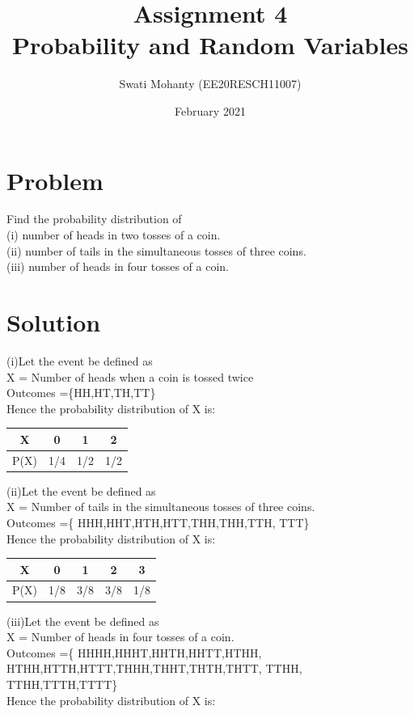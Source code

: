 \documentclass[journal,12pt,twocolumn]{IEEEtran}
\title{Assignment 4
\\Probability and Random Variables }
\author{Swati Mohanty (EE20RESCH11007) }
\date{February 2021}
\begin{document}
\maketitle


\section{Problem}
Find the probability distribution of
\\(i) number of heads in two tosses of a coin.
\\(ii) number of tails in the simultaneous tosses
of three coins.
\\(iii) number of heads in four tosses of a coin.

\section{Solution}

(i)Let the event be defined as
\\X = Number of heads when a coin is tossed twice
\\Outcomes =\{HH,HT,TH,TT\}
\\Hence the probability distribution of X is: 

\begin{center}
\begin{tabular}{ |c|c|c|c| } 
 \hline
 X & 0 & 1 & 2 \\\hline 
 P(X) & 1/4 & 1/2 & 1/2 \\ 
 \hline
\end{tabular}
\end{center}
(ii)Let the event be defined as
\\X = Number of tails in the simultaneous tosses of three coins.
\\Outcomes =\{ HHH,HHT,HTH,HTT,THH,THH,TTH,
TTT\}
\\Hence the probability distribution of X is: 

\begin{center}
\begin{tabular}{ |c|c|c|c|c| } 
 \hline
 X & 0 & 1 & 2 & 3 \\ \hline
 P(X) & 1/8 & 3/8 & 3/8 & 1/8 \\ 
 \hline
\end{tabular}
\end{center}
(iii)Let the event be defined as
\\X = Number of heads in four tosses of a coin.
\\Outcomes =\{ HHHH,HHHT,HHTH,HHTT,HTHH,
HTHH,HTTH,HTTT,THHH,THHT,THTH,THTT,
TTHH, TTHH,TTTH,TTTT\}
\\Hence the probability distribution of X is: 
\end{document}
